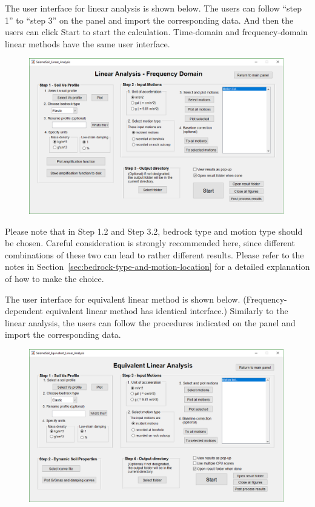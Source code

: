 \documentclass[11pt,letterpaper]{article}
\begin{document}
The user interface for linear analysis is shown below. The users can follow ``step 1'' to ``step 3'' on the panel and import the corresponding data. And then the users can click \textsf{Start} to start the calculation. Time-domain and frequency-domain linear methods have the same user interface.

\begin{figure}[H]
\centering
  \includegraphics[width=0.99\textwidth]{linear_panel.png}\\
\end{figure}


Please note that in Step 1.2 and Step 3.2, bedrock type and motion type should be chosen. Careful consideration is strongly recommended here, since different combinations of these two can lead to rather different results.  Please refer to the notes in Section~\ref{sec:bedrock-type-and-motion-location} for a detailed explanation of how to make the choice.

The user interface for equivalent linear method is shown below. (Frequency-dependent equivalent linear method has identical interface.) Similarly to the linear analysis, the users can follow the procedures indicated on the panel and import the corresponding data.

\begin{figure}[H]
\centering
  \includegraphics[width=0.99\textwidth]{equivalent_linear_panel.png}\\
\end{figure}
\end{document}
